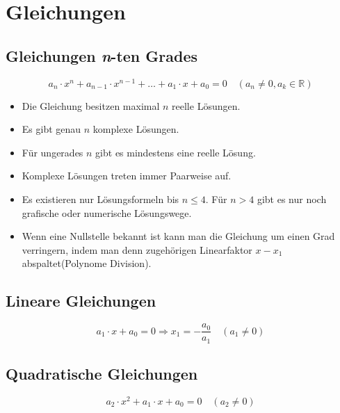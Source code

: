 \section{Gleichungen}
\subsection{Gleichungen \emph{n}-ten Grades}
\begin{shaded}
 \begin{equation}
  a_n\cdot x^n+a_{n-1}\cdot x^{n-1}+\ldots+a_1\cdot x+a_0=0\quad (a_n\neq0,a_k\in\mathbb{R})
 \end{equation}

\end{shaded}
\begin{itemize}
 \item Die Gleichung besitzen maximal $n$ reelle Lösungen.
\item Es gibt genau $n$ komplexe Lösungen.
\item Für ungerades $n$ gibt es mindestens eine reelle Lösung.
\item Komplexe Lösungen treten immer Paarweise auf.
\item Es existieren nur Lösungsformeln bis $n\leq 4$. Für $n>4$ gibt es nur noch grafische oder numerische Lösungswege.
\item Wenn eine Nullstelle bekannt ist kann man die Gleichung um einen Grad verringern, indem man denn zugehörigen Linearfaktor $x -x_1$ abspaltet(Polynome Division).
\end{itemize}

\subsection{Lineare Gleichungen}
\begin{shaded}
 \begin{equation}
  a_1\cdot x+a_0=0 \Rightarrow x_1=-\frac{a_0}{a_1}\quad (a_1\neq 0)
 \end{equation}
\end{shaded}

\subsection{Quadratische Gleichungen}
\begin{shaded}
 \begin{equation}
  a_2\cdot x^2+a_1\cdot x+a_0=0\quad (a_2\neq0)
 \end{equation}
\end{shaded}

